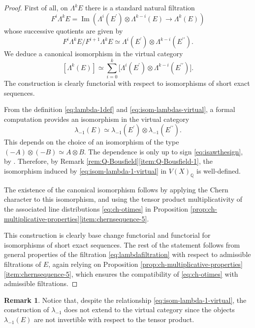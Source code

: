 \documentclass[11pt]{article}
\theoremstyle{plain}
\theoremstyle{definition}
\newtheorem{remark}[theorem]{Remark}
\newcommand{\QBbb}{\mathbb Q}
\newcommand{\bis}{\prime\prime}
\DeclareMathOperator{\Imag}{Im}
\begin{document}
\begin{proof}

First of all, on $\Lambda^k E$ there is a standard natural filtration
\begin{displaymath} F^i \Lambda^k E =\Imag ( \Lambda^{i} (E^{\prime}) \otimes \Lambda^{k-i}(E) \to \Lambda^k (E))
\end{displaymath} whose successive quotients are given by
\begin{equation}\label{eq:lambdafiltration}
F^i\Lambda^k E/F^{i+1}\Lambda^k E \simeq \Lambda^{i} (E^{\prime}) \otimes \Lambda^{k-i} (E^{\bis}).
\end{equation}
We deduce a canonical isomorphism in the virtual category
\begin{equation}\label{eq:isom-lambdas-virtual}
[\Lambda^k (E)] \simeq \sum_{i=0}^k \bigl[ \Lambda^{i} (E^{\prime}) \otimes \Lambda^{k-i} (E^{\bis}) \bigr].
\end{equation}
The construction is clearly functorial with respect to isomorphisms of short exact sequences.

From the definition \eqref{eq:lambda-1def} and \eqref{eq:isom-lambdas-virtual}, a formal computation provides an isomorphism in the virtual category
\begin{equation}\label{eq:isom-lambda-1-virtual}
\lambda_{-1}(E) \simeq \lambda_{-1}(E^{\prime}) \otimes \lambda_{-1}(E^{\bis}).
\end{equation}
This depends on the choice of an isomorphism of the type $(-A) \otimes (-B) \simeq A \otimes B$. The dependence is only up to sign \eqref{eq:isawthesign}, by \cite[ (b)]{Deligne-determinant}. Therefore, by Remark \ref{rem:Q-Bousfield}\eqref{item:Q-Bousfield-1}, the isomorphism induced by \eqref{eq:isom-lambda-1-virtual} in $V(X)_{\QBbb}$ is well-defined.

The existence of the canonical isomorphism follows by applying the Chern character to this isomorphism, and using the tensor product multiplicativity of the associated line distributions \eqref{eq:ch-otimes} in Proposition \ref{prop:ch-multiplicative-properties}\eqref{item:chernsequence-5}.

This construction is clearly base change functorial and functorial for isomorphisms of short exact sequences. The rest of the statement follows from general properties of the filtration \eqref{eq:lambdafiltration} with respect to admissible filtrations of $E$, again relying on Proposition \ref{prop:ch-multiplicative-properties}\eqref{item:chernsequence-5}, which ensures the compatibility of \eqref{eq:ch-otimes} with admissible filtrations.
\end{proof}
\begin{remark}
Notice that, despite the relationship \eqref{eq:isom-lambda-1-virtual}, the construction of $\lambda_{-1}$ does not extend to the virtual category since the objects $\lambda_{-1}(E)$ are not invertible with respect to the tensor product.
\end{remark}
\end{document}
